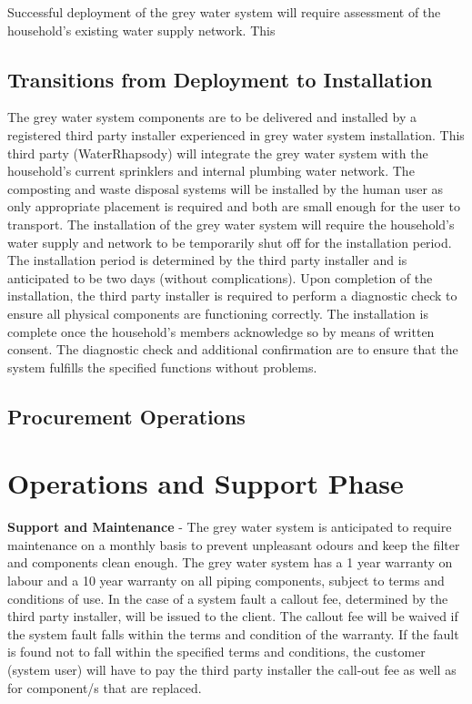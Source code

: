 \documentclass[a4paper,11pt,fleqn]{report}
\begin{document}
Successful deployment of the grey water system will require assessment of the household's existing water supply network. This 

\subsection{Transitions from Deployment to Installation}
The grey water system components are to be delivered and installed by a registered third party installer experienced in grey water system installation. This third party (WaterRhapsody) will integrate the grey water system with the household's current sprinklers and internal plumbing water network. The composting and waste disposal systems will be installed by the human user as only appropriate placement is required and both are small enough for the user to transport. The installation of the grey water system will require the household's water supply and network to be temporarily shut off for the installation period. The installation period is determined by the third party installer and is anticipated to be two days (without complications).  Upon completion of the installation, the third party installer is required to perform a diagnostic check to ensure all physical components are functioning correctly. The installation is complete once the household's members acknowledge so by means of written consent. The diagnostic check and additional confirmation are to ensure that the system fulfills the specified functions without problems.

\subsection{Procurement Operations}

\section{Operations and Support Phase}
\textbf{Support and Maintenance} - The grey water system is anticipated to require maintenance on a monthly basis to prevent unpleasant odours and keep the filter and components clean enough. The grey water system has a 1 year warranty on labour and a 10 year warranty on all piping components, subject to terms and conditions of use. In the case of a system fault a callout fee, determined by the third party installer,  will be issued to the client. The callout fee will be waived if the system fault falls within the terms and condition of the warranty. If the fault is found not to fall within the specified terms and conditions, the customer (system user) will have to pay the third party installer the call-out fee as well as for component/s that are replaced.
\end{document}
